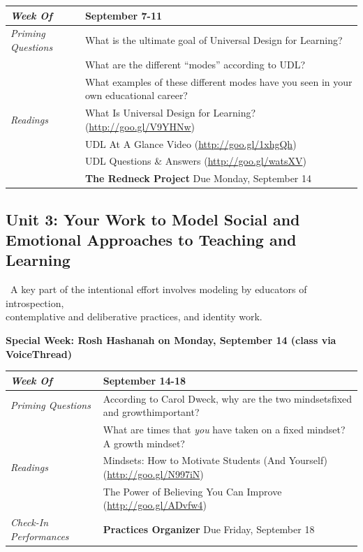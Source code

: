 \documentclass{tufte-handout}
\newcommand{\gentopic}[1]{\begin{fullwidth}\begin{center}\faKey~\textsf{#1}\end{center}\end{fullwidth}}
\newcommand{\tabpq}{\faQuestionSign\medspace\textit{Priming Questions}}
\newcommand{\tabread}{\faBook\medspace\textit{Readings}}
\newcommand{\tabdt}{\faCalendar\medspace\textit{Week Of}}
\newcommand{\tabcheckin}{\faPagelines\medspace\textit{Check-In Performances}}
\newcommand{\specialweek}[1]{\begin{fullwidth}\begin{center}\textbf{\faBullhorn\medspace Special Week: #1 \medspace\faBullhorn}\end{center}\end{fullwidth}}
\newenvironment{tabsched}
	{\small
	\begin{tabular}{p{1.5in}p{4.5in}}
	\midrule}
	{\midrule
	\end{tabular}
	\normalsize}
\newcommand{\weekfour}{September 7-11}
\newcommand{\weekfive}{September 14-18}
\newcommand{\roshhashanah}{Rosh Hashanah on Monday, September 14 (class via VoiceThread)}
\begin{document}
\begin{tabsched}
	\tabdt & \weekfour \\
	\midrule
	\tabpq & What is the ultimate goal of Universal Design for Learning? \\
	& What are the different \enquote{modes} according to UDL? \\
	& What examples of these different modes have you seen in your own educational career? \\
	\midrule
	\tabread & What Is Universal Design for Learning? (\url{http://goo.gl/V9YHNw}) \\
	& UDL At A Glance Video (\url{http://goo.gl/1xhgQh}) \\
	& UDL Questions \& Answers (\url{http://goo.gl/watsXV}) \\
	\midrule
	\tabperfomance & \textbf{The Redneck Project} Due Monday, September 14 \\
\end{tabsched}

\newpage

\begin{fullwidth}
	\section{Unit 3: Your Work to Model Social and Emotional Approaches to Teaching and Learning}
\end{fullwidth}

\gentopic{A key part of the intentional effort involves modeling by educators of introspection,\\contemplative and deliberative practices, and identity work.}

\specialweek{\roshhashanah}

\begin{tabsched}
	\tabdt & \weekfive \\
	\midrule
	\tabpq & According to Carol Dweck, why are the two mindsets\textemdash{}fixed and growth\textemdash{}important? \\
	& What are times that \emph{you} have taken on a fixed mindset? A growth mindset? \\
	\midrule
	\tabread & Mindsets: How to Motivate Students (And Yourself) (\url{http://goo.gl/N997iN}) \\
	& The Power of Believing You Can Improve (\url{http://goo.gl/ADvfw4}) \\
	\midrule
	\tabcheckin & \textbf{Practices Organizer} Due Friday, September 18 \\
\end{tabsched}
\end{document}

